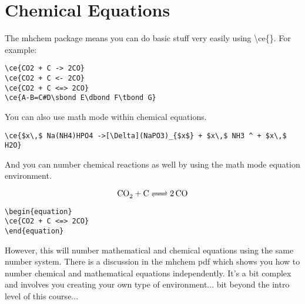 \chapter{Chemical Equations}
The mhchem package means you can do basic stuff very easily using {\textbackslash}ce\{\}. For example:

\vspace{2ex}

\begin{center}



\end{center}

\begin{verbatim}
\ce{CO2 + C -> 2CO}
\ce{CO2 + C <- 2CO}
\ce{CO2 + C <=> 2CO}
\ce{A-B=C#D\sbond E\dbond F\tbond G}
\end{verbatim}

\vspace{2ex}
You can also use math mode within chemical equations.
\vspace{2ex}

\begin{center}
\end{center}

\begin{verbatim}
\ce{$x\,$ Na(NH4)HPO4 ->[\Delta](NaPO3)_{$x$} + $x\,$ NH3 ^ + $x\,$ H2O}
\end{verbatim}

And you can number chemical reactions as well by using the math mode equation environment.

\begin{equation}
\ce{CO2 + C <=> 2CO}
\end{equation}

\begin{verbatim}
\begin{equation}
\ce{CO2 + C <=> 2CO}
\end{equation}
\end{verbatim}

However, this will number mathematical and chemical equations using the same number system. There is a discussion in the mhchem pdf which shows you how to number chemical and mathematical equations independently. It's a bit complex and involves you creating your own type of environment... bit beyond the intro level of this course...